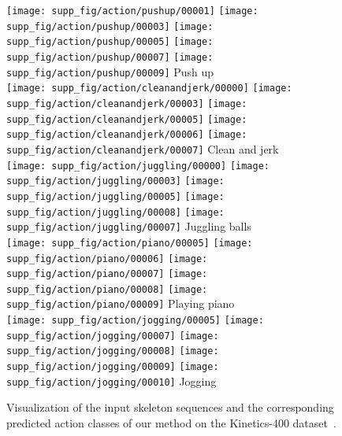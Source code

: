 \documentclass{article}
\begin{document}
\begin{figure}[t]
\centering
\hspace{-0.6cm}\texttt{[image: supp\_fig/action/pushup/00001]}
\texttt{[image: supp\_fig/action/pushup/00003]}
\texttt{[image: supp\_fig/action/pushup/00005]}
\texttt{[image: supp\_fig/action/pushup/00007]}
\texttt{[image: supp\_fig/action/pushup/00009]}
Push up\\
\hspace{-0.6cm}\texttt{[image: supp\_fig/action/cleanandjerk/00000]}
\texttt{[image: supp\_fig/action/cleanandjerk/00003]}
\texttt{[image: supp\_fig/action/cleanandjerk/00005]}
\texttt{[image: supp\_fig/action/cleanandjerk/00006]}
\texttt{[image: supp\_fig/action/cleanandjerk/00007]}
Clean and jerk\\
\hspace{-0.6cm}\texttt{[image: supp\_fig/action/juggling/00000]}
\texttt{[image: supp\_fig/action/juggling/00003]}
\texttt{[image: supp\_fig/action/juggling/00005]}
\texttt{[image: supp\_fig/action/juggling/00008]}
\texttt{[image: supp\_fig/action/juggling/00007]}
Juggling balls\\
\hspace{-0.6cm}\texttt{[image: supp\_fig/action/piano/00005]}
\texttt{[image: supp\_fig/action/piano/00006]}
\texttt{[image: supp\_fig/action/piano/00007]}
\texttt{[image: supp\_fig/action/piano/00008]}
\texttt{[image: supp\_fig/action/piano/00009]}
Playing piano\\
\hspace{-0.6cm}\texttt{[image: supp\_fig/action/jogging/00005]}
\texttt{[image: supp\_fig/action/jogging/00007]}
\texttt{[image: supp\_fig/action/jogging/00008]}
\texttt{[image: supp\_fig/action/jogging/00009]}
\texttt{[image: supp\_fig/action/jogging/00010]}
Jogging\\

\caption{Visualization of the input skeleton sequences and the corresponding predicted action classes of our method on the Kinetics-400 dataset~\cite{kay2017kinetics}.}
\label{fig:supp_action}
\end{figure} 
\end{document}

